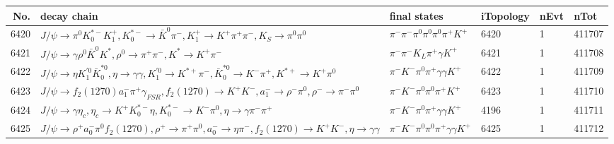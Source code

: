 \begin{table}[htbp] 
\begin{center}
\begin{small}
\begin{tabular}{rlllll}\hline\hline
 No. & decay chain & final states &  iTopology & nEvt & nTot \\\hline
6420&$J/\psi       \rightarrow \pi^{0}        K_{0}^{*-}     K_1^{+}        , K_{0}^{*-}      \rightarrow \bar{K}^{0}   \pi^{-}        , K_1^{+}         \rightarrow K^{+}          \pi^{+}        \pi^{-}        , K_{S}           \rightarrow \pi^{0}        \pi^{0}        $&$\pi^{-}        \pi^{-}        \pi^{0}        \pi^{0}        \pi^{0}        \pi^{+}        K^{+}          $& 6420&    1&411707\\
6421&$J/\psi       \rightarrow \gamma       \rho^{0}      \bar{K}^{0}   K^{*}          , \rho^{0}       \rightarrow \pi^{+}        \pi^{-}        , K^{*}           \rightarrow K^{+}          \pi^{-}        $&$\pi^{-}        \pi^{-}        K_{L}          \pi^{+}        \gamma       K^{+}          $& 6421&    1&411708\\
6422&$J/\psi       \rightarrow \eta          K_1^{'0}      \bar{K}_0^{*0}, \eta           \rightarrow \gamma       \gamma       , K_1^{'0}       \rightarrow K^{*+}         \pi^{-}        , \bar{K}_0^{*0} \rightarrow K^{-}          \pi^{+}        , K^{*+}          \rightarrow K^{+}          \pi^{0}        $&$\pi^{-}        K^{-}          \pi^{0}        \pi^{+}        \gamma       \gamma       K^{+}          $& 6422&    1&411709\\
6423&$J/\psi       \rightarrow f_{2}(1270)    a_{1}^{-}      \pi^{+}        \gamma_{FSR} , f_{2}(1270)     \rightarrow K^{+}          K^{-}          , a_{1}^{-}       \rightarrow \rho^{-}      \pi^{0}        , \rho^{-}       \rightarrow \pi^{-}        \pi^{0}        $&$\pi^{-}        K^{-}          \pi^{0}        \pi^{0}        \pi^{+}        K^{+}          $& 6423&    1&411710\\
6424&$J/\psi       \rightarrow \gamma       \eta_{c}    , \eta_{c}     \rightarrow K^{+}          K_{0}^{*-}     \eta          , K_{0}^{*-}      \rightarrow K^{-}          \pi^{0}        , \eta           \rightarrow \gamma       \pi^{-}        \pi^{+}        $&$\pi^{-}        K^{-}          \pi^{0}        \pi^{+}        \gamma       \gamma       K^{+}          $& 4196&    1&411711\\
6425&$J/\psi       \rightarrow \rho^{+}      a_{0}^{-}      \pi^{0}        f_{2}(1270)    , \rho^{+}       \rightarrow \pi^{+}        \pi^{0}        , a_{0}^{-}       \rightarrow \eta          \pi^{-}        , f_{2}(1270)     \rightarrow K^{+}          K^{-}          , \eta           \rightarrow \gamma       \gamma       $&$\pi^{-}        K^{-}          \pi^{0}        \pi^{0}        \pi^{+}        \gamma       \gamma       K^{+}          $& 6425&    1&411712\\

\end{tabular}
\end{small}
\end{center}
\end{table}
